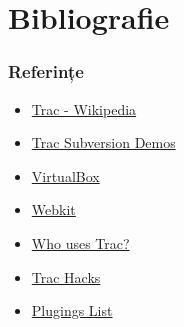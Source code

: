 \documentclass{beamer}
\begin{document}
\section{Bibliografie}

  \frame{\tableofcontents[currentsection]}

  \begin{frame}
  \frametitle{Referințe}

  \begin{itemize}
 
  \item \href{http://en.wikipedia.org/wiki/Trac}{Trac - Wikipedia}
  \item \href{http://www.webfaction.com/demos/trac-svn}{Trac Subversion Demos}
  \item \href{http://www.virtualbox.org/}{VirtualBox}
  \item \href{http://webkit.org/}{Webkit}
  \item \href{http://trac.edgewall.org/wiki/TracUsers}{Who uses Trac?}
  \item \href{http://trac-hacks.org/}{Trac Hacks}
  \item \href{http://trac.edgewall.org/wiki/PluginList}{Plugings List}

  \end{itemize}
  \end{frame}
\end{document}
